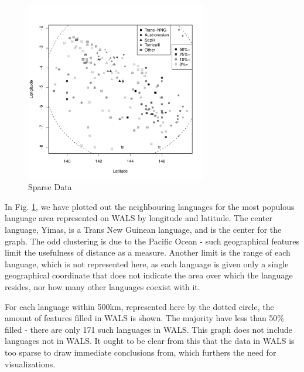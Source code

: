 \documentclass[11pt]{article}
\begin{document}
\begin{figure}[h]
\includegraphics[width=3.1in]
{graph1.pdf} 
\caption{Sparse Data} 
\label{fig:sparse} 
\end{figure}

In Fig. \ref{fig:sparse}, we have plotted out the neighbouring languages for the most populous language area represented on WALS by longitude and latitude. The center language, Yimas, is a Trans New Guinean language, and is the center for the graph. The odd clustering is due to the Pacific Ocean - such geographical features limit the usefulness of distance as a measure. Another limit is the range of each language, which is not represented here, as each language is given only a single geographical coordinate that does not indicate the area over which the language resides, nor how many other languages coexist with it.

For each language within 500km, represented here by the dotted circle, the amount of features filled in WALS is shown. The majority have less than 50\% filled - there are only 171 such languages in WALS. This graph does not include languages not in WALS. It ought to be clear from this that the data in WALS is too sparse to draw immediate conclusions from, which furthers the need for visualizations. 
\end{document}
